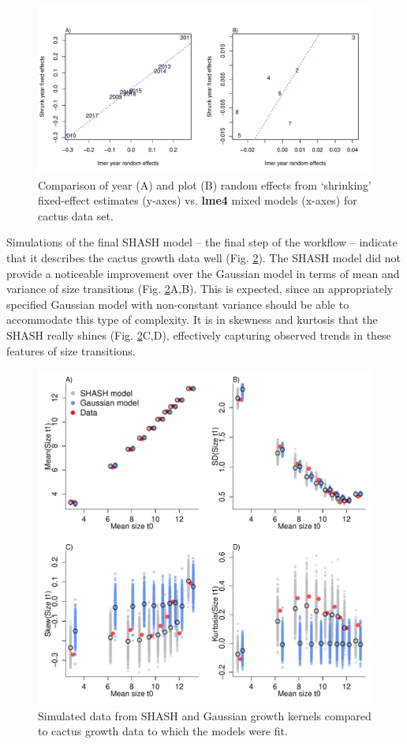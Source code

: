 \documentclass[11pt]{article}
\begin{document}
{\begin{figure}
\centering
\includegraphics[width=\textwidth]{figures/cactus_rfx_compare}
\caption{Comparison of year (A) and plot (B) random effects from `shrinking' fixed-effect estimates (y-axes) vs. \textbf{lme4} mixed models (x-axes) for cactus data set.}
\label{fig:cactus_rfx_compare}
\end{figure} 

Simulations of the final SHASH model -- the final step of the workflow -- indicate that it describes the cactus growth data well (Fig. \ref{fig:cactus_sim_moments}). 
The SHASH model did not provide a noticeable improvement over the Gaussian model in terms of mean and variance of size transitions (Fig. \ref{fig:cactus_sim_moments}A,B).
This is expected, since an appropriately specified Gaussian model with non-constant variance should be able to accommodate this type of complexity.
It is in skewness and kurtosis that the SHASH really shines (Fig. \ref{fig:cactus_sim_moments}C,D), effectively capturing observed trends in these features of size transitions. 

\begin{figure}
\centering
\includegraphics[width=\textwidth]{figures/cactus_sim_moments}
\caption{Simulated data from SHASH and Gaussian growth kernels compared to cactus growth data to which the models were fit.}
\label{fig:cactus_sim_moments}
\end{figure} 

}
\end{document}
